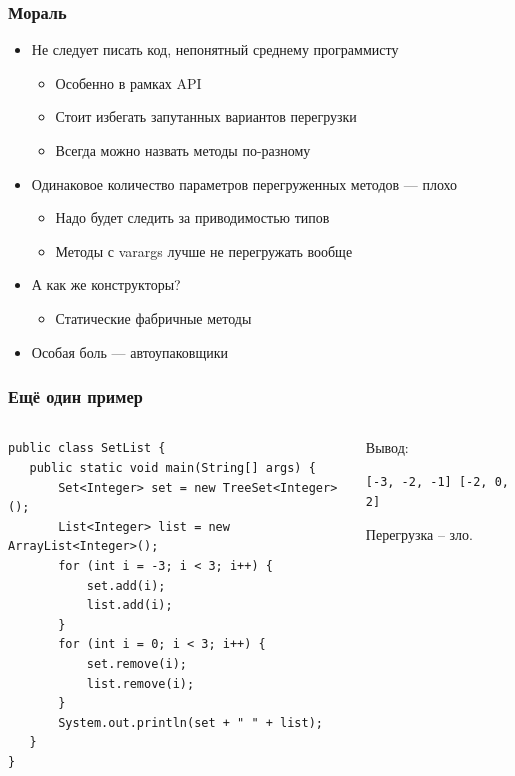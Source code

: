 \documentclass[xetex,mathserif,serif]{beamer}
\begin{document}
	\begin{frame}
		\frametitle{Мораль}
		\begin{itemize}
			\item Не следует писать код, непонятный среднему программисту
			\begin{itemize}
				\item Особенно в рамках API
				\item Стоит избегать запутанных вариантов перегрузки
				\item Всегда можно назвать методы по-разному
			\end{itemize}
			\item Одинаковое количество параметров перегруженных методов --- плохо
			\begin{itemize}
				\item Надо будет следить за приводимостью типов
				\item Методы с varargs лучше не перегружать вообще
			\end{itemize}
			\item А как же конструкторы?
			\begin{itemize}
				\item Статические фабричные методы
			\end{itemize}
			\item Особая боль --- автоупаковщики
		\end{itemize}
	\end{frame}

	\begin{frame}[fragile]
		\frametitle{Ещё один пример}
		\begin{columns}
			\begin{column}{0.7\textwidth}
				\begin{verbatim}
public class SetList {
   public static void main(String[] args) {
       Set<Integer> set = new TreeSet<Integer>();
       List<Integer> list = new ArrayList<Integer>();
       for (int i = -3; i < 3; i++) {
           set.add(i);
           list.add(i);
       }
       for (int i = 0; i < 3; i++) {
           set.remove(i);
           list.remove(i);
       }
       System.out.println(set + " " + list);
   }
}
				\end{verbatim}
			\end{column}
			\begin{column}{0.3\textwidth}
				\pause
				Вывод:
				\begin{verbatim}
[-3, -2, -1] [-2, 0, 2]
				\end{verbatim}
				\vspace{5mm}
				Перегрузка -- зло.
			\end{column}
		\end{columns}
	\end{frame}
\end{document}
